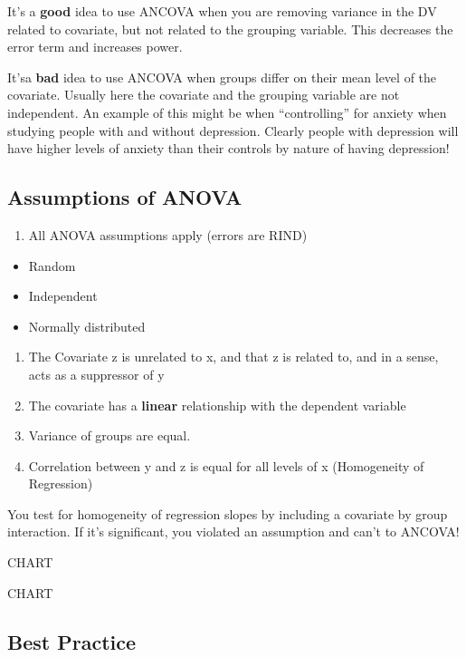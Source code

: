 \documentclass[]{book}
\providecommand{\tightlist}{%
  \setlength{\itemsep}{0pt}\setlength{\parskip}{0pt}}
\theoremstyle{definition}
\theoremstyle{definition}
\theoremstyle{definition}
\theoremstyle{remark}
\begin{document}
It's a \textbf{good} idea to use ANCOVA when you are removing variance
in the DV related to covariate, but not related to the grouping
variable. This decreases the error term and increases power.

It'sa \textbf{bad} idea to use ANCOVA when groups differ on their mean
level of the covariate. Usually here the covariate and the grouping
variable are not independent. An example of this might be when
``controlling'' for anxiety when studying people with and without
depression. Clearly people with depression will have higher levels of
anxiety than their controls by nature of having depression!

\subsection{Assumptions of ANOVA}\label{assumptions-of-anova}

\begin{enumerate}
\def\labelenumi{\arabic{enumi}.}
\tightlist
\item
  All ANOVA assumptions apply (errors are RIND)
\end{enumerate}

\begin{itemize}
\tightlist
\item
  Random
\item
  Independent
\item
  Normally distributed
\end{itemize}

\begin{enumerate}
\def\labelenumi{\arabic{enumi}.}
\setcounter{enumi}{1}
\tightlist
\item
  The Covariate z is unrelated to x, and that z is related to, and in a
  sense, acts as a suppressor of y
\item
  The covariate has a \textbf{linear} relationship with the dependent
  variable
\item
  Variance of groups are equal.
\item
  Correlation between y and z is equal for all levels of x (Homogeneity
  of Regression)
\end{enumerate}

You test for homogeneity of regression slopes by including a covariate
by group interaction. If it's significant, you violated an assumption
and can't to ANCOVA!

CHART

CHART

\subsection{Best Practice}\label{best-practice}
\end{document}
